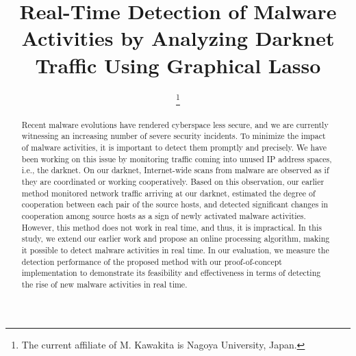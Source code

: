 \documentclass[conference]{IEEEtran}
\begin{document}
\title{
  Real-Time Detection of Malware Activities by Analyzing Darknet Traffic Using Graphical Lasso
}

\author{
    \thanks{The current affiliate of M. Kawakita is Nagoya University, Japan.}
}


\maketitle

\begin{abstract}
Recent malware evolutions have rendered cyberspace less secure, and we are currently witnessing an increasing number of severe security incidents.
To minimize the impact of malware activities, it is important to detect them promptly and precisely.
We have been working on this issue by monitoring traffic coming into unused IP address spaces, i.e., the darknet.
On our darknet, Internet-wide scans from malware are observed as if they are coordinated or working cooperatively.
Based on this observation, our earlier method monitored network traffic arriving at our darknet, estimated the degree of cooperation between each pair of the source hosts, and detected significant changes in cooperation among source hosts as a sign of newly activated malware activities.
However, this method does not work in real time, and thus, it is impractical.
In this study, we extend our earlier work and propose an online processing algorithm, making it possible to detect malware activities in real time.
In our evaluation, we measure the detection performance of the proposed method with our proof-of-concept implementation to demonstrate its feasibility and effectiveness in terms of detecting the rise of new malware activities in real time.
\end{abstract}
\end{document}
